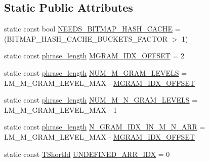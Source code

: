 \subsection*{Static Public Attributes}
\begin{DoxyCompactItemize}
\item 
static const bool \hyperlink{classuva_1_1smt_1_1bpbd_1_1server_1_1lm_1_1_generic_trie_base_a2b5781fbca37e23d15d0bfda78084984}{N\+E\+E\+D\+S\+\_\+\+B\+I\+T\+M\+A\+P\+\_\+\+H\+A\+S\+H\+\_\+\+C\+A\+C\+H\+E} = (B\+I\+T\+M\+A\+P\+\_\+\+H\+A\+S\+H\+\_\+\+C\+A\+C\+H\+E\+\_\+\+B\+U\+C\+K\+E\+T\+S\+\_\+\+F\+A\+C\+T\+O\+R $>$ 1)
\item 
static const \hyperlink{namespaceuva_1_1smt_1_1bpbd_1_1server_af068a19c2e03116caf3e3827a3e40e35}{phrase\+\_\+length} \hyperlink{classuva_1_1smt_1_1bpbd_1_1server_1_1lm_1_1_generic_trie_base_a39479f9edbb672ffdc4f52b0dcdc20f2}{M\+G\+R\+A\+M\+\_\+\+I\+D\+X\+\_\+\+O\+F\+F\+S\+E\+T} = 2
\item 
static const \hyperlink{namespaceuva_1_1smt_1_1bpbd_1_1server_af068a19c2e03116caf3e3827a3e40e35}{phrase\+\_\+length} \hyperlink{classuva_1_1smt_1_1bpbd_1_1server_1_1lm_1_1_generic_trie_base_aafc76eab16ca2e35293bcd0e1764394a}{N\+U\+M\+\_\+\+M\+\_\+\+G\+R\+A\+M\+\_\+\+L\+E\+V\+E\+L\+S} = L\+M\+\_\+\+M\+\_\+\+G\+R\+A\+M\+\_\+\+L\+E\+V\+E\+L\+\_\+\+M\+A\+X -\/ \hyperlink{classuva_1_1smt_1_1bpbd_1_1server_1_1lm_1_1_generic_trie_base_a39479f9edbb672ffdc4f52b0dcdc20f2}{M\+G\+R\+A\+M\+\_\+\+I\+D\+X\+\_\+\+O\+F\+F\+S\+E\+T}
\item 
static const \hyperlink{namespaceuva_1_1smt_1_1bpbd_1_1server_af068a19c2e03116caf3e3827a3e40e35}{phrase\+\_\+length} \hyperlink{classuva_1_1smt_1_1bpbd_1_1server_1_1lm_1_1_generic_trie_base_aa7a196dfb7719aa3b1a85f0502f2a34e}{N\+U\+M\+\_\+\+M\+\_\+\+N\+\_\+\+G\+R\+A\+M\+\_\+\+L\+E\+V\+E\+L\+S} = L\+M\+\_\+\+M\+\_\+\+G\+R\+A\+M\+\_\+\+L\+E\+V\+E\+L\+\_\+\+M\+A\+X -\/ 1
\item 
static const \hyperlink{namespaceuva_1_1smt_1_1bpbd_1_1server_af068a19c2e03116caf3e3827a3e40e35}{phrase\+\_\+length} \hyperlink{classuva_1_1smt_1_1bpbd_1_1server_1_1lm_1_1_generic_trie_base_ad192aaf1ab4773262ccd985a65c69a6d}{N\+\_\+\+G\+R\+A\+M\+\_\+\+I\+D\+X\+\_\+\+I\+N\+\_\+\+M\+\_\+\+N\+\_\+\+A\+R\+R} = L\+M\+\_\+\+M\+\_\+\+G\+R\+A\+M\+\_\+\+L\+E\+V\+E\+L\+\_\+\+M\+A\+X -\/ \hyperlink{classuva_1_1smt_1_1bpbd_1_1server_1_1lm_1_1_generic_trie_base_a39479f9edbb672ffdc4f52b0dcdc20f2}{M\+G\+R\+A\+M\+\_\+\+I\+D\+X\+\_\+\+O\+F\+F\+S\+E\+T}
\item 
static const \hyperlink{namespaceuva_1_1smt_1_1bpbd_1_1server_1_1lm_1_1identifiers_a33043a191e9a637dea742a89d23c8bdc}{T\+Short\+Id} \hyperlink{classuva_1_1smt_1_1bpbd_1_1server_1_1lm_1_1_generic_trie_base_a6fd6f53c986a715dbf7520d84c0f0f20}{U\+N\+D\+E\+F\+I\+N\+E\+D\+\_\+\+A\+R\+R\+\_\+\+I\+D\+X} = 0

\end{DoxyCompactItemize}
